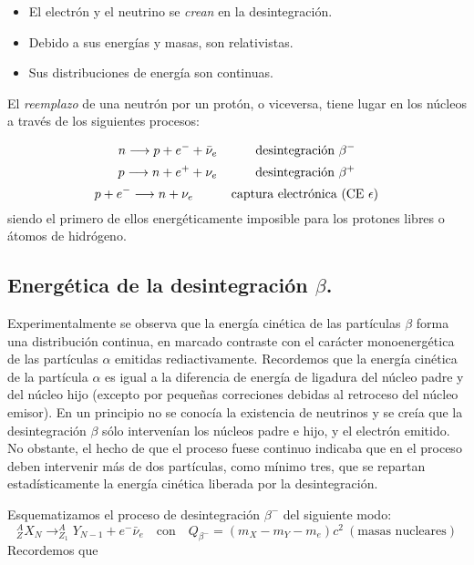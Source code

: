 \begin{itemize}
	\item El electrón y el neutrino se \textit{crean} en la desintegración.
	\item Debido a sus energías y masas, son relativistas.
	\item Sus distribuciones de energía son continuas.
\end{itemize}	

El \textit{reemplazo} de una neutrón por un protón, o viceversa, tiene lugar en los núcleos a través de los siguientes procesos:

\begin{equation}
	n \longrightarrow p + e^- + \bar{\nu}_e  \quad \quad \quad \text{desintegración} \ \beta^-
\end{equation}
\begin{equation}
	p \longrightarrow n + e^+ + {\nu}_e \quad \quad \quad \text{desintegración} \ \beta^+
\end{equation}
\begin{equation}
	p + e^- \longrightarrow n + {\nu}_e \quad \quad \quad \text{captura electrónica (CE} \ \epsilon)
\end{equation}
siendo el primero de ellos energéticamente imposible para los protones libres o átomos de hidrógeno. 

\subsection{Energética de la desintegración $\beta$.}

Experimentalmente se observa que la energía cinética de las partículas $\beta$ forma una distribución continua, en marcado contraste con el carácter monoenergética de las partículas $\alpha$ emitidas rediactivamente. Recordemos que la energía cinética de la partícula $\alpha$ es igual a la diferencia de energía de ligadura del núcleo padre y del núcleo hijo (excepto por pequeñas correciones debidas al retroceso del núcleo emisor). En un principio no se conocía la existencia de neutrinos y se creía que la desintegración $\beta$ sólo intervenían los núcleos padre e hijo, y el electrón emitido. No obstante, el hecho de que el proceso fuese continuo indicaba que en el proceso deben intervenir más de dos partículas, como mínimo tres, que se repartan estadísticamente la energía cinética liberada por la desintegración. 

Esquematizamos el proceso de desintegración $\beta^-$ del siguiente modo:
\begin{equation}
	^A_Z X_N \longrightarrow _{Z_1}^A Y_{N-1} + e^- \bar{\nu}_e \quad \text{con} \quad Q_{\beta^-} = (m_X-m_Y-m_e)c^2 \ (\text{masas nucleares})
\end{equation}
Recordemos que

